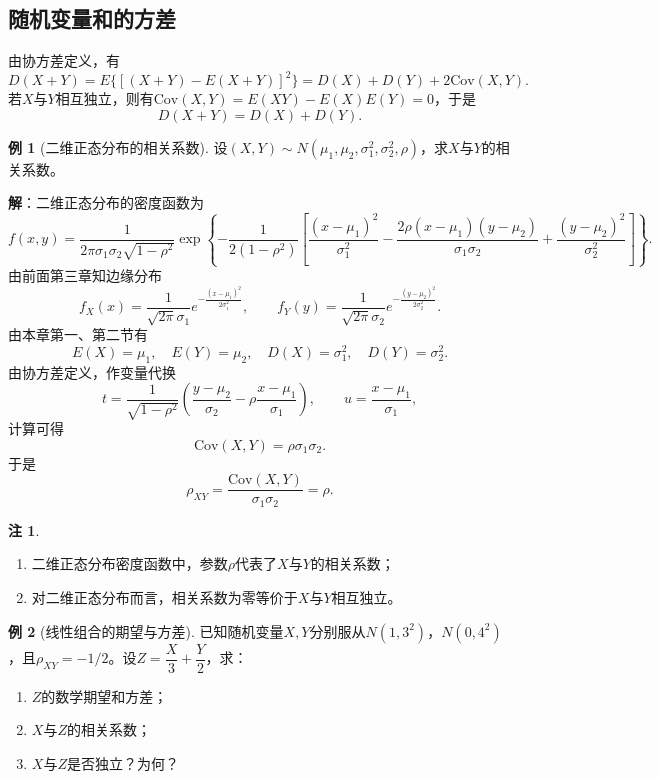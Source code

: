 \documentclass[11pt,a4paper]{report}
\theoremstyle{definition}
\newtheorem{example}{例}[chapter]
\newtheorem{note}{注}[chapter]
\begin{document}
\subsection{随机变量和的方差}

由协方差定义，有
\[
D(X+Y)=E\{[(X+Y)-E(X+Y)]^{2}\}=D(X)+D(Y)+2\mathrm{Cov}(X,Y).
\]
若$X$与$Y$相互独立，则有$\mathrm{Cov}(X,Y)=E(XY)-E(X)E(Y)=0$，于是
\[
D(X+Y)=D(X)+D(Y).
\]

\begin{example}[二维正态分布的相关系数]
设$(X,Y)\sim N(\mu_{1},\mu_{2},\sigma_{1}^{2},\sigma_{2}^{2},\rho)$，求$X$与$Y$的相关系数。
\end{example}

\textbf{解}：二维正态分布的密度函数为
\[
f(x,y)=\frac{1}{2\pi\sigma_{1}\sigma_{2}\sqrt{1-\rho^{2}}}
\exp\left\{-\frac{1}{2(1-\rho^{2})}\left[\frac{(x-\mu_{1})^{2}}{\sigma_{1}^{2}}
-\frac{2\rho(x-\mu_{1})(y-\mu_{2})}{\sigma_{1}\sigma_{2}}
+\frac{(y-\mu_{2})^{2}}{\sigma_{2}^{2}}\right]\right\}.
\]
由前面第三章知边缘分布
\[
f_{X}(x)=\frac{1}{\sqrt{2\pi}\sigma_{1}}e^{-\frac{(x-\mu_{1})^{2}}{2\sigma_{1}^{2}}},\qquad
f_{Y}(y)=\frac{1}{\sqrt{2\pi}\sigma_{2}}e^{-\frac{(y-\mu_{2})^{2}}{2\sigma_{2}^{2}}}.
\]
由本章第一、第二节有
\[
E(X)=\mu_{1},\quad E(Y)=\mu_{2},\quad D(X)=\sigma_{1}^{2},\quad D(Y)=\sigma_{2}^{2}.
\]
由协方差定义，作变量代换
\[
t=\frac{1}{\sqrt{1-\rho^{2}}}\left(\frac{y-\mu_{2}}{\sigma_{2}}-\rho\frac{x-\mu_{1}}{\sigma_{1}}\right),\qquad
u=\frac{x-\mu_{1}}{\sigma_{1}},
\]
计算可得
\[
\mathrm{Cov}(X,Y)=\rho\sigma_{1}\sigma_{2}.
\]
于是
\[
\rho_{XY}=\frac{\mathrm{Cov}(X,Y)}{\sigma_{1}\sigma_{2}}=\rho.
\]

\begin{note}
\begin{enumerate}[leftmargin=2em]
    \item 二维正态分布密度函数中，参数$\rho$代表了$X$与$Y$的相关系数；
    \item 对二维正态分布而言，相关系数为零等价于$X$与$Y$相互独立。
\end{enumerate}
\end{note}

\begin{example}[线性组合的期望与方差]
已知随机变量$X,Y$分别服从$N(1,3^{2})$，$N(0,4^{2})$，且$\rho_{XY}=-1/2$。设$Z=\dfrac{X}{3}+\dfrac{Y}{2}$，求：
\begin{enumerate}[label=(\arabic*),leftmargin=2em]
    \item $Z$的数学期望和方差；
    \item $X$与$Z$的相关系数；
    \item $X$与$Z$是否独立？为何？
\end{enumerate}
\end{example}
\end{document}
